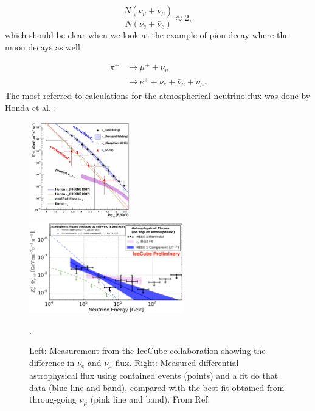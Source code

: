 \begin{equation}
\frac{N\left( \nu_\mu + \bar{\nu}_\mu\right) }{N\left(\nu_e + \bar{\nu}_e\right)} \approx 2,
\end{equation}
which should be clear when we look at the example of pion decay where the muon decays as well

\begin{align}
\pi^+ &\rightarrow \mu^+ + \nu_\mu \\
& \rightarrow e^+ + \nu_e + \bar{\nu}_\mu + \nu_\mu.
\end{align}
The most referred to calculations for the atmospherical neutrino flux was done by Honda et al. \cite{Honda:2006qj}.
\begin{figure}[t]
\centering
\includegraphics[width=0.39\textwidth]{chapter3/img/neutrinospectrum2.png}
\includegraphics[width=0.6\textwidth]{chapter3/img/astroflux.png}
\caption{Left: Measurement from the IceCube collaboration showing the difference in $\nu_e$ and $\nu_\mu$ flux. Right: Measured differential astrophysical flux using contained events (points) and a fit do that data (blue line and band), compared with the best fit obtained from throug-going $\nu_\mu$ (pink line and band). From Ref. \cite{Aartsen:2017mau}}.
\label{fig:neutrinospectrum2}
\end{figure}


